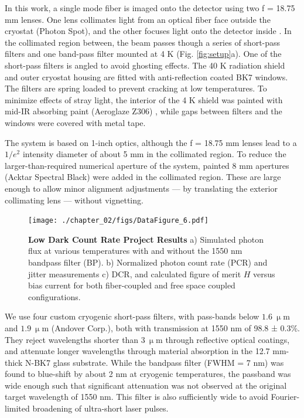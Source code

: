 \documentclass[11pt]{caltech_thesis} %
\begin{document}
In this work, a single mode fiber is imaged onto the detector using two f = 18.75 mm lenses. One lens collimates light from an optical fiber face outside the cryostat (Photon Spot), and the other focuses light onto the detector inside \autocite{Bellei:16}. In the collimated region between, the beam passes though a series of short-pass filters and one band-pass filter mounted at 4 K (Fig. \ref{fig:setup}a). One of the short-pass filters is angled to avoid ghosting effects. The 40 K radiation shield and outer cryostat housing are fitted with anti-reflection coated BK7 windows. The filters are spring loaded to prevent cracking at low temperatures. To minimize effects of stray light, the interior of the 4 K shield was painted with mid-IR absorbing paint (Aeroglaze Z306) \autocite{Persky1999}, while gaps between filters and the windows were covered with metal tape.

The system is based on 1-inch optics, although the f = 18.75 mm lenses lead to a $1/e^2$ intensity diameter of about 5 mm in the collimated region. To reduce the larger-than-required numerical aperture of the system, painted 8 mm apertures (Acktar Spectral Black) were added in the collimated region. These are large enough to allow minor alignment adjustments --- by translating the exterior collimating lens --- without vignetting.

\hypertarget{fig:dcrmin_data}{%
\begin{figure}
\centering
\texttt{[image: ./chapter\_02/figs/DataFigure\_6.pdf]}
\caption[{Low Dark Count Rate Project Results.}]{\textbf{Low Dark Count Rate Project Results} a) Simulated photon flux at various temperatures with and without the 1550 nm bandpass filter (BP). b) Normalized photon count rate (PCR) and jitter measurements c) DCR, and calculated figure of merit $H$ versus bias current for both fiber-coupled and free space coupled configurations.}
\label{fig:dcrmin_data}
\end{figure}
}

We use four custom cryogenic short-pass filters, with pass-bands below $1.6 \ \mathrm{\upmu m}$ and $1.9 \ \mathrm{\upmu m}$ (Andover Corp.), both with transmission at 1550 nm of 98.8 ± 0.3\%. They reject wavelengths shorter than $3 \ \mathrm{\upmu m}$ through reflective optical coatings, and attenuate longer wavelengths through material absorption in the 12.7 mm-thick N-BK7 glass substrate. While the bandpass filter (FWHM = 7 nm) was found to blue-shift by about 2 nm at cryogenic temperatures, the passband was wide enough such that significant attenuation was not observed at the original target wavelength of 1550 nm. This filter is also sufficiently wide to avoid Fourier-limited broadening of ultra-short laser pulses.
\end{document}
